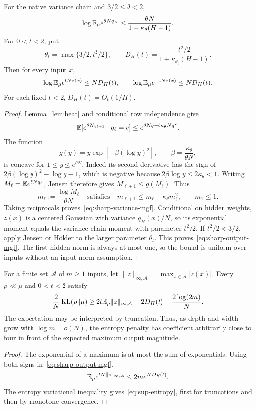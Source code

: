 \begin{theorem}
\label{thm:sharp-mgf}
For the native variance chain and $3/2\le\theta<2$,
\begin{equation}
 \log\mathbb E_\mu e^{\theta Nq_H}
 \le\frac{\theta N}{1+\kappa_\theta(H-1)}.
 \label{eq:sharp-variance-mgf}
\end{equation}
For $0<t<2$, put
\[
 \theta_t=\max\{3/2,t^2/2\},\qquad
 D_H(t)=\frac{t^2/2}{1+\kappa_{\theta_t}(H-1)}.
\]
Then for every input $x$,
\begin{equation}
 \log\mathbb E_\mu e^{tNz(x)}\le N D_H(t),\qquad
 \log\mathbb E_\mu e^{-tNz(x)}\le N D_H(t).
 \label{eq:sharp-output-mgf}
\end{equation}
For each fixed $t<2$, $D_H(t)=O_t(1/H)$.
\end{theorem}
\begin{proof}
Lemma~\ref{lem:heat} and conditional row independence give
\[
 \mathbb E[e^{\theta Nq_{\ell+1}}\mid q_\ell=q]
 \le e^{\theta Nq-\theta\kappa_\theta Nq^2}.
\]
The function
\[
 g(y)=y\exp[-\beta(\log y)^2],\qquad
 \beta=\frac{\kappa_\theta}{\theta N},
\]
is concave for $1\le y\le e^{\theta N}$. Indeed its second derivative has the sign of
$2\beta(\log y)^2-\log y-1$, which is negative because
$2\beta\log y\le2\kappa_\theta<1$.
Writing $M_\ell=\mathbb E e^{\theta Nq_\ell}$, Jensen therefore gives
$M_{\ell+1}\le g(M_\ell)$. Thus
\[
 m_\ell:=\frac{\log M_\ell}{\theta N}
 \quad\text{satisfies}\quad
 m_{\ell+1}\le m_\ell-\kappa_\theta m_\ell^2,
 \qquad m_1\le1.
\]
Taking reciprocals proves~\eqref{eq:sharp-variance-mgf}. Conditional on hidden weights, $z(x)$ is a centered Gaussian with variance $q_H(x)/N$, so its exponential moment equals the variance-chain moment with parameter $t^2/2$. If $t^2/2<3/2$, apply Jensen or H\"older to the larger parameter $\theta_t$. This proves~\eqref{eq:sharp-output-mgf}. The first hidden norm is always at most one, so the bound is uniform over inputs without an input-norm assumption.
\end{proof}

\begin{corollary}
\label{cor:sup-entropy}
For a finite set $\mathcal A$ of $m\ge1$ inputs, let
$\|z\|_{\infty,\mathcal A}=\max_{x\in\mathcal A}|z(x)|$. Every $\rho\ll\mu$ and $0<t<2$ satisfy
\begin{equation}
 \frac2N\operatorname{KL}(\rho\|\mu)
 \ge2t\mathbb E_\rho\|z\|_{\infty,\mathcal A}
       -2D_H(t)-\frac{2\log(2m)}N.
 \label{eq:sup-entropy}
\end{equation}
The expectation may be interpreted by truncation. Thus, as depth and width grow with $\log m=o(N)$, the entropy penalty has coefficient arbitrarily close to four in front of the expected maximum output magnitude.
\end{corollary}
\begin{proof}
The exponential of a maximum is at most the sum of exponentials. Using both signs in~\eqref{eq:sharp-output-mgf},
\[
 \mathbb E_\mu e^{tN\|z\|_{\infty,\mathcal A}}
 \le2m e^{ND_H(t)}.
\]
The entropy variational inequality gives~\eqref{eq:sup-entropy}, first for truncations and then by monotone convergence.
\end{proof}

